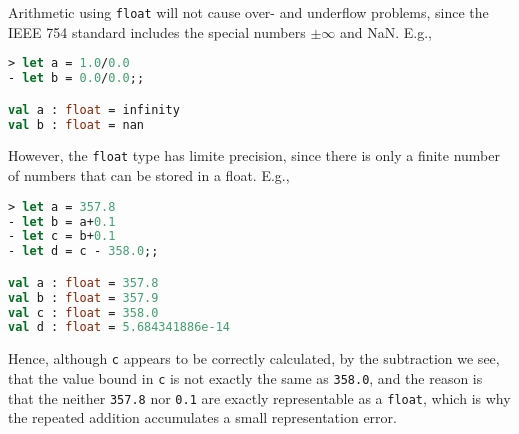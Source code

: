Arithmetic using \lstinline|float| will not cause over- and underflow problems, since the IEEE 754 standard includes the special numbers $\pm\infty$ and NaN. E.g.,
%
\begin{lstlisting}[language=fsharp,caption={fsharpi, floating point numbers include infinity and Not-a-Number}]
> let a = 1.0/0.0  
- let b = 0.0/0.0;;

val a : float = infinity
val b : float = nan
\end{lstlisting}
However, the \lstinline|float| type has limite precision, since there is only a finite number of numbers that can be stored in a float. E.g.,
%
\begin{lstlisting}[language=fsharp,caption={fsharpi, floating point arithmatic has finite precision.}]
> let a = 357.8      
- let b = a+0.1      
- let c = b+0.1      
- let d = c - 358.0;;

val a : float = 357.8
val b : float = 357.9
val c : float = 358.0
val d : float = 5.684341886e-14
\end{lstlisting}
Hence, although \lstinline|c| appears to be correctly calculated, by the subtraction we see, that the value bound in \lstinline|c| is not exactly the same as \lstinline|358.0|, and the reason is that the neither \lstinline|357.8| nor \lstinline|0.1| are exactly representable as a \lstinline|float|, which is why the repeated addition accumulates a small representation error.

